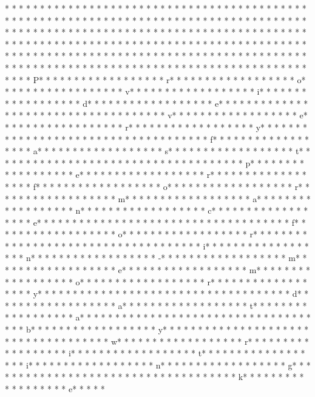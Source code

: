 * * *  * * *  * * *  *  * * *  *  * * *  * 	* * *  * * *  * * *  *  * * *  *  * * *  * 	* * *  * * *  * * *  *  * * *  *  * * *  * 
* * *  * * *  * * *  *  * * *  *  * * *  * 	* * *  * * *  * * *  *  * * *  *  * * *  * 	* * *  * * *  * * *  *  * * *  *  * * *  * * *  * * *  *  * * *  *  * * *  * * *  * * *  *  * * *  *  * * *  *  * * *  * * *  * * *  *  * * *  *  * * *  *  * * *  * * *  * * *  *  * * *  *  * * *  *  * * *  * * *  * * *  *  * * *  *  * * *  *  * * *  * * *  * * *  *  * * *  *  * * *  *  * * *  * * *  * * *  *  * * *  *  * * *  *  * * *  * * *  * * *  *  * * *  *  * * *  *  * * *  * * *  * * *  *  * * *  *  * * *  * P* * *  * * *  * * *  *  * * *  *  * * *  * r* * *  * * *  * * *  *  * * *  *  * * *  * o* * *  * * *  * * *  *  * * *  *  * * *  * v* * *  * * *  * * *  *  * * *  *  * * *  * i* * *  * * *  * * *  *  * * *  *  * * *  * d* * *  * * *  * * *  *  * * *  *  * * *  * e* * *  * * *  * * *  *  * * *  *  * * *  *  * * *  * * *  * * *  *  * * *  *  * * *  * v* * *  * * *  * * *  *  * * *  *  * * *  * e* * *  * * *  * * *  *  * * *  *  * * *  * r* * *  * * *  * * *  *  * * *  *  * * *  * y* * *  * * *  * * *  *  * * *  *  * * *  *  * * *  * * *  * * *  *  * * *  *  * * *  * f* * *  * * *  * * *  *  * * *  *  * * *  * a* * *  * * *  * * *  *  * * *  *  * * *  * s* * *  * * *  * * *  *  * * *  *  * * *  * t* * *  * * *  * * *  *  * * *  *  * * *  *  * * *  * * *  * * *  *  * * *  *  * * *  * p* * *  * * *  * * *  *  * * *  *  * * *  * e* * *  * * *  * * *  *  * * *  *  * * *  * r* * *  * * *  * * *  *  * * *  *  * * *  * f* * *  * * *  * * *  *  * * *  *  * * *  * o* * *  * * *  * * *  *  * * *  *  * * *  * r* * *  * * *  * * *  *  * * *  *  * * *  * m* * *  * * *  * * *  *  * * *  *  * * *  * a* * *  * * *  * * *  *  * * *  *  * * *  * n* * *  * * *  * * *  *  * * *  *  * * *  * c* * *  * * *  * * *  *  * * *  *  * * *  * e* * *  * * *  * * *  *  * * *  *  * * *  *  * * *  * * *  * * *  *  * * *  *  * * *  * f* * *  * * *  * * *  *  * * *  *  * * *  * o* * *  * * *  * * *  *  * * *  *  * * *  * r* * *  * * *  * * *  *  * * *  *  * * *  *  * * *  * * *  * * *  *  * * *  *  * * *  * i* * *  * * *  * * *  *  * * *  *  * * *  * n* * *  * * *  * * *  *  * * *  *  * * *  * -* * *  * * *  * * *  *  * * *  *  * * *  * m* * *  * * *  * * *  *  * * *  *  * * *  * e* * *  * * *  * * *  *  * * *  *  * * *  * m* * *  * * *  * * *  *  * * *  *  * * *  * o* * *  * * *  * * *  *  * * *  *  * * *  * r* * *  * * *  * * *  *  * * *  *  * * *  * y* * *  * * *  * * *  *  * * *  *  * * *  *  * * *  * * *  * * *  *  * * *  *  * * *  * d* * *  * * *  * * *  *  * * *  *  * * *  * a* * *  * * *  * * *  *  * * *  *  * * *  * t* * *  * * *  * * *  *  * * *  *  * * *  * a* * *  * * *  * * *  *  * * *  *  * * *  *  * * *  * * *  * * *  *  * * *  *  * * *  * b* * *  * * *  * * *  *  * * *  *  * * *  * y* * *  * * *  * * *  *  * * *  *  * * *  *  * * *  * * *  * * *  *  * * *  *  * * *  * w* * *  * * *  * * *  *  * * *  *  * * *  * r* * *  * * *  * * *  *  * * *  *  * * *  * i* * *  * * *  * * *  *  * * *  *  * * *  * t* * *  * * *  * * *  *  * * *  *  * * *  * i* * *  * * *  * * *  *  * * *  *  * * *  * n* * *  * * *  * * *  *  * * *  *  * * *  * g* * *  * * *  * * *  *  * * *  *  * * *  *  * * *  * * *  * * *  *  * * *  *  * * *  * k* * *  * * *  * * *  *  * * *  *  * * *  * e* * *  * * 